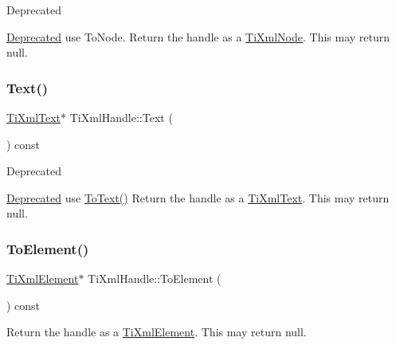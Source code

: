 \begin{DoxyRefDesc}{Deprecated}
\item[\hyperlink{deprecated__deprecated000001}{Deprecated}]use To\+Node. Return the handle as a \hyperlink{classTiXmlNode}{Ti\+Xml\+Node}. This may return null. \end{DoxyRefDesc}
\mbox{\label{classTiXmlHandle_ad3b502c72059421e4dfcc7bda3c392fe}} 
\subsubsection{\texorpdfstring{Text()}{Text()}}
{\footnotesize\ttfamily \hyperlink{classTiXmlText}{Ti\+Xml\+Text}$\ast$ Ti\+Xml\+Handle\+::\+Text (\begin{DoxyParamCaption}{ }\end{DoxyParamCaption}) const\hspace{0.3cm}{\ttfamily [inline]}}

\begin{DoxyRefDesc}{Deprecated}
\item[\hyperlink{deprecated__deprecated000003}{Deprecated}]use \hyperlink{classTiXmlHandle_abde286bce1d5db0d20ec30e573278cdf}{To\+Text()} Return the handle as a \hyperlink{classTiXmlText}{Ti\+Xml\+Text}. This may return null. \end{DoxyRefDesc}
\mbox{\label{classTiXmlHandle_a0e3a5333550237d899b1df2b965611a1}} 
\subsubsection{\texorpdfstring{To\+Element()}{ToElement()}}
{\footnotesize\ttfamily \hyperlink{classTiXmlElement}{Ti\+Xml\+Element}$\ast$ Ti\+Xml\+Handle\+::\+To\+Element (\begin{DoxyParamCaption}{ }\end{DoxyParamCaption}) const\hspace{0.3cm}{\ttfamily [inline]}}

Return the handle as a \hyperlink{classTiXmlElement}{Ti\+Xml\+Element}. This may return null. \mbox{\label{classTiXmlHandle_a0e436dea2dd869a859e3a4486023f0fa}} 
